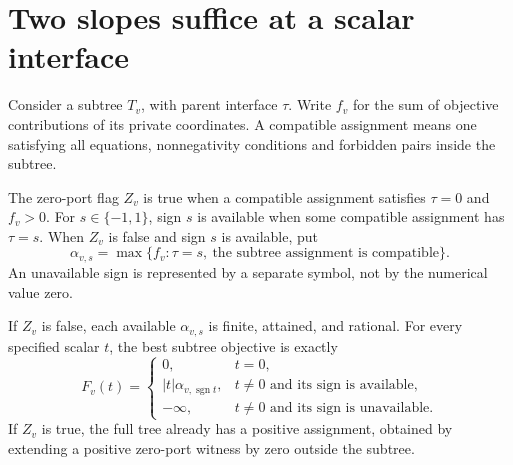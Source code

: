 \section{Two slopes suffice at a scalar interface}
\label{sec:messages}

Consider a subtree $T_v$, with parent interface $\tau$. Write $f_v$ for the sum
of objective contributions of its private coordinates. A compatible assignment
means one satisfying all equations, nonnegativity conditions and forbidden
pairs inside the subtree.

\begin{definition}
The zero-port flag $Z_v$ is true when a compatible assignment satisfies
$\tau=0$ and $f_v>0$. For $s\in\{-1,1\}$, sign $s$ is available when some
compatible assignment has $\tau=s$. When $Z_v$ is false and sign $s$ is available,
put
\[
 \alpha_{v,s}=\max\{f_v:\tau=s,\ \text{the subtree assignment is compatible}\}.
\]
An unavailable sign is represented by a separate symbol, not by the numerical
value zero.
\end{definition}

\begin{theorem}
\label{thm:message}
If $Z_v$ is false, each available $\alpha_{v,s}$ is finite, attained, and rational.
For every specified scalar $t$, the best subtree objective is exactly
\[
 F_v(t)=
 \begin{cases}
 0,&t=0,\\
 |t|\alpha_{v,\operatorname{sgn}t},&t\ne0\text{ and its sign is available},\\
 -\infty,&t\ne0\text{ and its sign is unavailable}.
 \end{cases}
\]
If $Z_v$ is true, the full tree already has a positive assignment, obtained by
extending a positive zero-port witness by zero outside the subtree.
\end{theorem}

